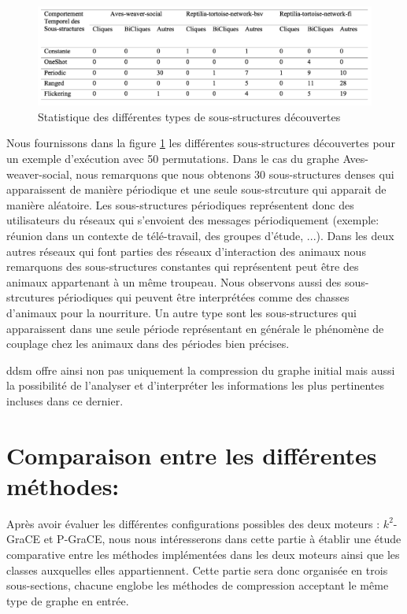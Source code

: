 	\begin{figure}[H]
		
		 \includegraphics[scale=0.38]{ressources/image/statDDSM.png}
			
			
			\caption{Statistique des différentes types de sous-structures découvertes}
			\label{fig:stat-DDSM}
		
	\end{figure}	
	
	Nous fournissons dans la figure \ref{fig:stat-DDSM} les différentes sous-structures découvertes pour un exemple d'exécution avec 50 permutations. Dans le cas du graphe Aves-weaver-social, nous remarquons que nous obtenons 30 sous-structures denses qui apparaissent de manière périodique et une seule sous-strcuture qui apparait de manière aléatoire. Les sous-structures périodiques représentent donc des utilisateurs du réseaux qui s'envoient des messages  périodiquement (exemple: réunion dans un contexte de télé-travail, des groupes d'étude, ...). Dans les deux autres réseaux qui font parties des réseaux d'interaction des animaux nous remarquons des sous-structures constantes qui représentent peut être des animaux appartenant à un même troupeau. Nous observons aussi des sous-strcutures périodiques qui peuvent être interprétées comme des chasses d'animaux pour la nourriture. Un autre type sont les sous-structures qui apparaissent dans une seule période représentant en générale le phénomène de couplage chez les animaux dans des périodes bien précises.
	
	\gls{ddsm} offre ainsi non pas uniquement la compression du graphe initial mais aussi la possibilité de l'analyser et d'interpréter les informations les plus pertinentes incluses dans ce dernier.
	
	\section{Comparaison entre les différentes méthodes:}
	
	Après avoir évaluer les différentes configurations possibles des deux moteurs : $k^2$-GraCE et P-GraCE, nous nous intéresserons dans cette partie à établir une étude comparative entre les méthodes implémentées dans les deux moteurs ainsi que les classes auxquelles elles appartiennent. Cette partie sera donc organisée en trois sous-sections, chacune englobe les méthodes de compression acceptant le même type de graphe en entrée.
	
